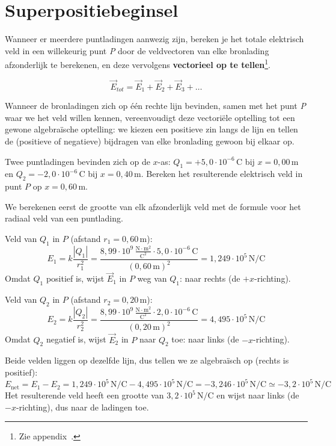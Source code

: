 \documentclass{ximera}
\begin{document}
\section{Superpositiebeginsel}
Wanneer er meerdere puntladingen aanwezig zijn, bereken je het totale elektrisch veld in een willekeurig punt \textit{P} door de veldvectoren van elke bronlading afzonderlijk te berekenen, en deze vervolgens \textbf{vectorieel op te tellen}\footnote{Zie appendix~.}.

$$ \vec{E}_{tot} = \vec{E}_1 + \vec{E}_2 + \vec{E}_3 + \dots $$

Wanneer de bronladingen zich op één rechte lijn bevinden, samen met het punt \textit{P} waar we het veld willen kennen, vereenvoudigt deze vectoriële optelling tot een gewone algebraïsche optelling: we kiezen een positieve zin langs de lijn en tellen de (positieve of negatieve) bijdragen van elke bronlading gewoon bij elkaar op.

\begin{example}[foldable=true,title={Superpositie van twee puntladingen op een lijn}]\nl
    Twee puntladingen bevinden zich op de $x$-as: $Q_{1}=+5{,}0 \cdot 10^{-6} \, \mathrm{C}$ bij $x=0{,}00 \, \mathrm{m}$ en $Q_{2}=-2{,}0 \cdot 10^{-6} \, \mathrm{C}$ bij $x=0{,}40 \, \mathrm{m}$. Bereken het resulterende elektrisch veld in punt $P$ op $x=0{,}60 \, \mathrm{m}$.
    \begin{solution}\nl
        We berekenen eerst de grootte van elk afzonderlijk veld met de formule voor het radiaal veld van een puntlading.

        Veld van $Q_{1}$ in $P$ (afstand $r_{1}=0{,}60 \, \mathrm{m}$):
        \[
            E_{1}=k\frac{|Q_{1}|}{r_{1}^{2}}=\frac{8{,}99 \cdot 10^{9} \, \mathrm{\frac{N \cdot m^2}{C^2}} \cdot 5{,}0 \cdot 10^{-6} \, \mathrm{C}}{(0{,}60 \, \mathrm{m})^{2}}=1{,}249 \cdot 10^{5} \, \mathrm{N/C}
        \]
        Omdat $Q_{1}$ positief is, wijst $\vec{E}_{1}$ in $P$ weg van $Q_{1}$: naar rechts (de $+x$-richting).

        Veld van $Q_{2}$ in $P$ (afstand $r_{2}=0{,}20 \, \mathrm{m}$):
        \[
            E_{2}=k\frac{|Q_{2}|}{r_{2}^{2}}=\frac{8{,}99 \cdot 10^{9} \, \mathrm{\frac{N \cdot m^2}{C^2}} \cdot 2{,}0 \cdot 10^{-6} \, \mathrm{C}}{(0{,}20 \, \mathrm{m})^{2}}=4{,}495 \cdot 10^{5} \, \mathrm{N/C}
        \]
        Omdat $Q_{2}$ negatief is, wijst $\vec{E}_{2}$ in $P$ naar $Q_{2}$ toe: naar links (de $-x$-richting).

        Beide velden liggen op dezelfde lijn, dus tellen we ze algebraïsch op (rechts is positief):
        \[
            E_{\text{net}}=E_{1}-E_{2}=1{,}249 \cdot 10^{5} \, \mathrm{N/C} - 4{,}495 \cdot 10^{5} \, \mathrm{N/C} = -3{,}246 \cdot 10^{5} \, \mathrm{N/C} \simeq \boxed{-3{,}2 \cdot 10^{5} \, \mathrm{N/C}}
        \]
        Het resulterende veld heeft een grootte van $3{,}2 \cdot 10^{5} \, \mathrm{N/C}$ en wijst naar links (de $-x$-richting), dus naar de ladingen toe.
    \end{solution}
\end{example}
\end{document}
